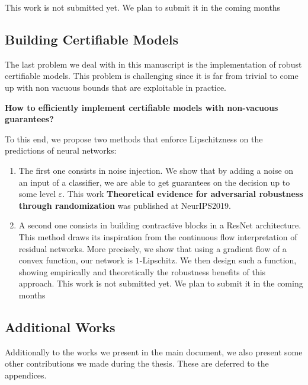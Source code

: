 This work is not submitted yet. We plan to submit it in the coming months
\subsection{Building Certifiable Models}

The last problem we deal with in this manuscript is the implementation of robust certifiable models. This problem is challenging since it is far from trivial to come up with non vacuous bounds that are exploitable in practice.
\medskip
\begin{tcolorbox}[title=Question 3]
\textbf{How to efficiently implement certifiable models with non-vacuous guarantees?}
\end{tcolorbox}
\medskip
To this end, we propose two methods that enforce Lipschitzness on the predictions of neural networks:
\begin{enumerate}
    \item The first one consists in noise injection. We show that by adding a noise on an input of a classifier, we are able to get guarantees on the decision up to some level $\varepsilon$. This work \textbf{Theoretical evidence for adversarial robustness through randomization} was published at NeurIPS2019.
    \item A second one consists in building contractive blocks in a ResNet architecture. This method draws its inspiration from the continuous flow interpretation of residual networks. More precisely, we show that using a gradient flow of a convex function, our network is $1$-Lipschitz. We then design such a function, showing empirically and theoretically the robustness benefits of this approach. This work is not submitted yet. We plan to submit it in the coming months

\end{enumerate}

\subsection{Additional Works}
Additionally to the works we present in the main document, we also present some other contributions we made during the thesis. These are deferred to the appendices. 

